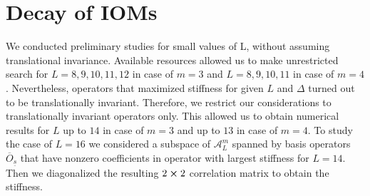 \chapter{Decay of IOMs}
\thispagestyle{chapterBeginStyle}


We conducted preliminary studies for small values of L, without assuming translational invariance. Available resources
allowed us to make unrestricted search for \(L = 8,9,10,11,12\) in case of \(m = 3\) and \(L = 8,9,10,11\) in case of
\(m = 4\). Nevertheless, operators that maximized stiffness for given \(L\) and \(\Delta \) turned out to be translationally
invariant. Therefore, we restrict our considerations to translationally invariant operators only. This allowed us
to obtain numerical results for \(L\) up to \(14\) in case of \(m = 3\) and up to \(13\) in case of \(m = 4\).
To study the case of  \(L = 16\) we considered a subspace of \(\mathcal{A}_L^m\) spanned by basis operators
\(\overline{O}_{\underline{s}}\) that have nonzero coefficients in operator with largest stiffness for \(L = 14\). 
Then we diagonalized the resulting \(2\cross 2\) correlation matrix to obtain the stiffness.


